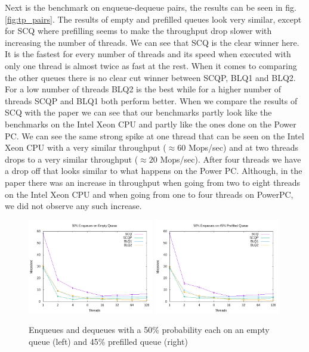 \documentclass{article}      %
\begin{document}
Next is the benchmark on enqueue-dequeue pairs, the results can be seen in fig. \ref{fig:tp_pairs}. The results of empty and prefilled queues look very similar, except for SCQ where prefilling seems to make the throughput drop slower with increasing the number of threads.  We can see that SCQ is the clear winner here. It is the fastest for every number of threads and its speed when executed with only one thread is almost twice as fast at the rest. When it comes to comparing the other queues there is no clear cut winner between SCQP, BLQ1 and BLQ2. For a low number of threads BLQ2 is the best while for a higher number of threads SCQP and BLQ1 both perform better. When we compare the results of SCQ with the paper we can see that our benchmarks partly look like the benchmarks on the Intel Xeon CPU and partly like the ones done on the Power PC.
We can see the same strong spike at one thread that can be seen on the Intel Xeon CPU with a very similar throughput ($\approx 60$ Mops/sec) and at two threads drops to a very similar throughput ($\approx 20$ Mops/sec). After four threads we have a drop off that looks similar to what happens on the Power PC. Although, in the paper there was an increase in throughput when going from two to eight threads on the Intel Xeon CPU and when going from one to four threads on PowerPC, we did not observe any such increase.


\begin{figure}[hbtp]
	\centering
	\includegraphics[width=0.49\textwidth]{Pictures/tp_50enq_empty.png}
	\includegraphics[width=0.49\textwidth]{Pictures/tp_50enq_90.png}
	\caption{Enqueues and dequeues with a 50\% probability each on an empty queue (left) and 45\% prefilled queue (right)}
	\label{fig:tp_enqdeq50}
\end{figure}
\end{document}
